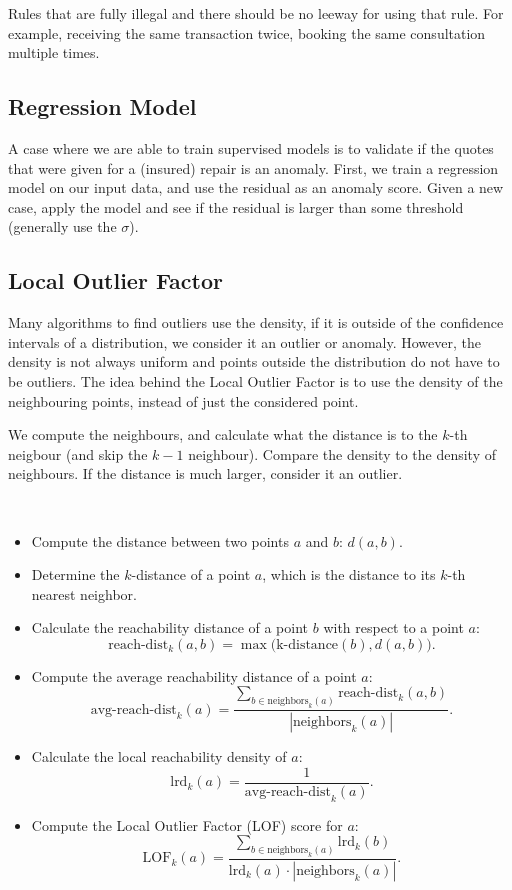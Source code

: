 Rules that are fully illegal and there should be no leeway for
using that rule. For example, receiving the same transaction twice,
booking the same consultation multiple times.

\subsection{Regression Model}

A case where we are able to train supervised models is to validate
if the quotes that were given for a (insured) repair is an anomaly.
First, we train a regression model on our input data, and use the
residual as an anomaly score. Given a new case, apply the model and
see if the residual is larger than some threshold (generally use the
$\sigma$).

\subsection{Local Outlier Factor}

Many algorithms to find outliers use the density, if it is
outside of the confidence intervals of a distribution, we consider
it an outlier or anomaly. However, the density is not always uniform
and points outside the distribution do not have to be outliers.
The idea behind the Local Outlier Factor is to use the density
of the neighbouring points, instead of just the considered point.

We compute the neighbours, and calculate what the distance is to
the $k$-th neigbour (and skip the $k-1$ neighbour). Compare the density
to the density of neighbours. If the distance is much larger, consider
it an outlier.

\begin{definition}
  ~
  \begin{itemize}
    \item Compute the distance between two points $a$ and $b$: $d(a, b)$.
    \item Determine the $k$-distance of a point $a$, which is the
      distance to its $k$-th nearest neighbor.
    \item Calculate the reachability distance of a point $b$ with
      respect to a point $a$:
      \[
        \text{reach-dist}_k(a, b) = \max\big(\text{k-distance}(b), d(a, b)\big).
      \]
    \item Compute the average reachability distance of a point $a$:
      \[
        \text{avg-reach-dist}_k(a) = \frac{\sum_{b \in
          \text{neighbors}_k(a)} \text{reach-dist}_k(a,
        b)}{|\text{neighbors}_k(a)|}.
      \]
    \item Calculate the local reachability density of $a$:
      \[
        \text{lrd}_k(a) = \frac{1}{\text{avg-reach-dist}_k(a)}.
      \]
    \item Compute the Local Outlier Factor (LOF) score for $a$:
      \[
        \text{LOF}_k(a) = \frac{\sum_{b \in \text{neighbors}_k(a)}
        \text{lrd}_k(b)}{\text{lrd}_k(a) \cdot |\text{neighbors}_k(a)|}.
      \]
  \end{itemize}
\end{definition}

